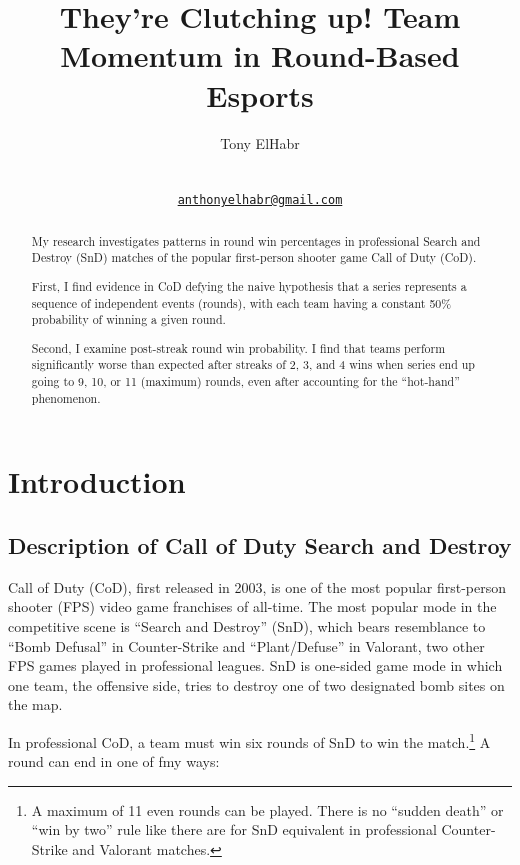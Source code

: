 \documentclass{article}
\title{They're Clutching up! Team Momentum in Round-Based Esports}
\author{
    Tony ElHabr
   \\
     \\
   \\
  \texttt{\href{mailto:anthonyelhabr@gmail.com}{\nolinkurl{anthonyelhabr@gmail.com}}} \\
  }
\begin{document}
\maketitle


\begin{abstract}
My research investigates patterns in round win percentages in
professional Search and Destroy (SnD) matches of the popular
first-person shooter game Call of Duty (CoD).

First, I find evidence in CoD defying the naive hypothesis that a series
represents a sequence of independent events (rounds), with each team
having a constant 50\% probability of winning a given round.

Second, I examine post-streak round win probability. I find that teams
perform significantly worse than expected after streaks of 2, 3, and 4
wins when series end up going to 9, 10, or 11 (maximum) rounds, even
after accounting for the ``hot-hand'' phenomenon.
\end{abstract}


\hypertarget{introduction}{%
\section{Introduction}\label{introduction}}

\hypertarget{description-of-call-of-duty-search-and-destroy}{%
\subsection{Description of Call of Duty Search and
Destroy}\label{description-of-call-of-duty-search-and-destroy}}

Call of Duty (CoD), first released in 2003, is one of the most popular
first-person shooter (FPS) video game franchises of all-time. The most
popular mode in the competitive scene is ``Search and Destroy'' (SnD),
which bears resemblance to ``Bomb Defusal'' in Counter-Strike and
``Plant/Defuse'' in Valorant, two other FPS games played in professional
leagues. SnD is one-sided game mode in which one team, the offensive
side, tries to destroy one of two designated bomb sites on the map.

In professional CoD, a team must win six rounds of SnD to win the
match.\footnote{A maximum of 11 even rounds can be played. There is no
  ``sudden death'' or ``win by two'' rule like there are for SnD
  equivalent in professional Counter-Strike and Valorant matches.} A
round can end in one of fmy ways:
\end{document}
